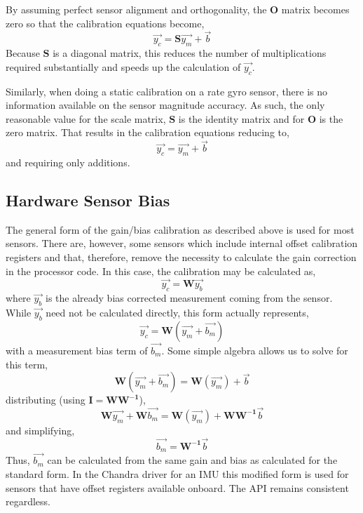 \documentclass[10pt,letterpaper]{memoir} %
\begin{document}
By assuming perfect sensor alignment and orthogonality, the $\mathbf{O}$ matrix becomes zero so that the calibration equations become,
\begin{equation}
	\vec{y_c} = \mathbf{S}\vec{y_m} + \vec{b}
\end{equation}
Because $\mathbf{S}$ is a diagonal matrix, this reduces the number of multiplications required substantially and speeds up the calculation of $\vec{y_c}$.

Similarly, when doing a static calibration on a rate gyro sensor, there is no information available on the sensor magnitude accuracy.  As such, the only reasonable value for the scale matrix, $\mathbf{S}$ is the identity matrix and for $\mathbf{O}$ is the zero matrix.  That results in the calibration equations reducing to,
\begin{equation}
\vec{y_c} = \vec{y_m} + \vec{b}
\end{equation}
and requiring only additions.


\subsection{Hardware Sensor Bias}
The general form of the gain/bias calibration as described above is used for most sensors.  There are, however, some sensors which include internal offset calibration registers and that, therefore, remove the necessity to calculate the gain correction in the processor code.  In this case, the calibration may be calculated as,
\begin{equation}
	\vec{y_c} = \mathbf{W}\vec{y_b}
\end{equation} 
where $\vec{y_b}$ is the already bias corrected measurement coming from the sensor.  While $\vec{y_b}$ need not be calculated directly, this form actually represents,
\begin{equation}
	\vec{y_c} = \mathbf{W}(\vec{y_m}+\vec{b_m})
\end{equation}  
with a measurement bias term of $\vec{b_m}$.  Some simple algebra allows us to solve for this term,
\begin{equation}
	\mathbf{W}(\vec{y_m}+\vec{b_m}) = \mathbf{W}(\vec{y_m}) + \vec{b}
\end{equation}  
distributing (using $\mathbf{I} = \mathbf{W}\mathbf{W^{-1}}$),
\begin{equation}
	\mathbf{W}\vec{y_m}+\mathbf{W}\vec{b_m} = \mathbf{W}(\vec{y_m}) + \mathbf{W}\mathbf{W^{-1}}\vec{b}
\end{equation}
and simplifying,
\begin{equation}
	\vec{b_m} = \mathbf{W^{-1}}\vec{b}
\end{equation}
Thus, $\vec{b_m}$ can be calculated from the same gain and bias as calculated for the standard form.  In the Chandra driver for an IMU this modified form is used for sensors that have offset registers available onboard.  The API remains consistent regardless.
\end{document}
